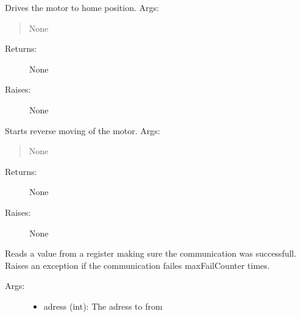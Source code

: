 \documentclass[letterpaper,10pt,english]{sphinxmanual}
\begin{document}
\begin{fulllineitems}
\begin{fulllineitems}
\end{fulllineitems}


\begin{fulllineitems}
\label{stepperMotor:stepperMotor.StepperMotor.goHome}
Drives the motor to home position.
Args:
\begin{quote}

None
\end{quote}
\begin{description}
\item[{Returns:}] \leavevmode
None

\item[{Raises:}] \leavevmode
None

\end{description}

\end{fulllineitems}


\begin{fulllineitems}
\label{stepperMotor:stepperMotor.StepperMotor.goReverse}
Starts reverse moving of the motor.
Args:
\begin{quote}

None
\end{quote}
\begin{description}
\item[{Returns:}] \leavevmode
None

\item[{Raises:}] \leavevmode
None

\end{description}

\end{fulllineitems}


\begin{fulllineitems}
\label{stepperMotor:stepperMotor.StepperMotor.readRegisterSafe}
Reads a value from a register making sure the communication was successfull.
Raises an exception if the communication failes maxFailCounter times.
\begin{description}
\item[{Args:}] \leavevmode\begin{itemize}
\item {} 
adress (int): The adress to from


\end{itemize}
\end{description}
\end{fulllineitems}
\end{fulllineitems}
\end{document}
